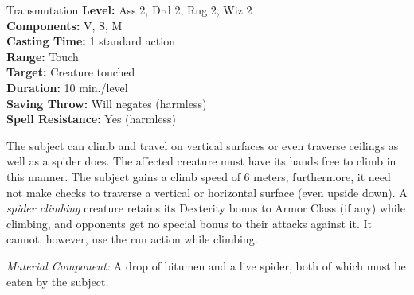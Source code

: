 {Transmutation}
{
	\textbf{Level:}
	Ass 2, Drd 2, Rng 2, Wiz 2\\
	\textbf{Components:}
	V, S, M\\
	\textbf{Casting Time:}
	1 standard action\\
	\textbf{Range:}
	Touch\\
	\textbf{Target:}
	Creature touched\\
	\textbf{Duration:}
	10 min./level\\
	\textbf{Saving Throw:}
	Will negates (harmless)\\
	\textbf{Spell Resistance:}
	Yes (harmless)\\
}
{
	The subject can climb and travel on vertical surfaces or even traverse ceilings as well as a spider does. The affected creature must have its hands free to climb in this manner. The subject gains a climb speed of 6 meters; furthermore, it need not make  checks to traverse a vertical or horizontal surface (even upside down). A \emph{spider climbing} creature retains its Dexterity bonus to Armor Class (if any) while climbing, and opponents get no special bonus to their attacks against it. It cannot, however, use the run action while climbing.

	\textit{Material Component:}
	A drop of bitumen and a live spider, both of which must be eaten by the subject.

}
